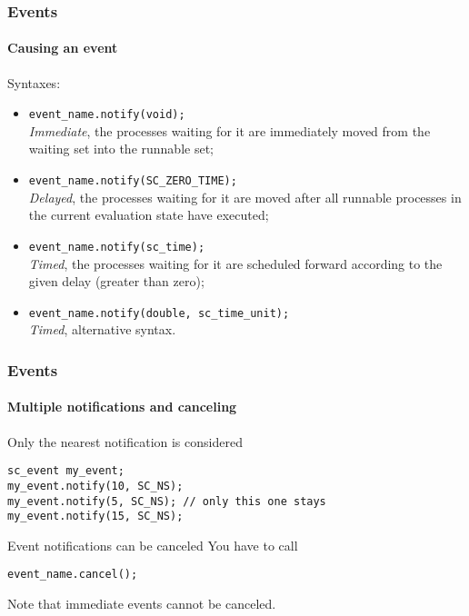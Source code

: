 \begin{frame}[fragile]
\frametitle{Events}
\framesubtitle{Causing an event}

\begin{block}{Syntaxes:}
\begin{itemize}
\item \texttt{event\_name.notify(void);} \\ {\em Immediate}, the processes waiting for it are immediately moved from the waiting set into the runnable set;
\pause
\item \texttt{event\_name.notify(SC\_ZERO\_TIME);} \\ {\em Delayed}, the processes waiting for it are moved after all runnable processes in the current evaluation state have executed;
\pause
\item \texttt{event\_name.notify(sc\_time);} \\ {\em Timed}, the processes waiting for it are scheduled forward according to the given delay (greater than zero);
\pause
\item \texttt{event\_name.notify(double, sc\_time\_unit);} \\ {\em Timed}, alternative syntax.
\end{itemize}
\end{block}

\end{frame}

\begin{frame}[fragile]
\frametitle{Events}
\framesubtitle{Multiple notifications and canceling}

\begin{block}{Only the nearest notification is considered}
\vspace{-1em}
\begin{verbatim}
sc_event my_event;
my_event.notify(10, SC_NS);
my_event.notify(5, SC_NS); // only this one stays
my_event.notify(15, SC_NS);
\end{verbatim}
\vspace{-1em}
\end{block}
\pause
\begin{block}{Event notifications can be canceled}
You have to call
\begin{verbatim}
event_name.cancel();
\end{verbatim}
Note that immediate events cannot be canceled.
\end{block}

\end{frame}

